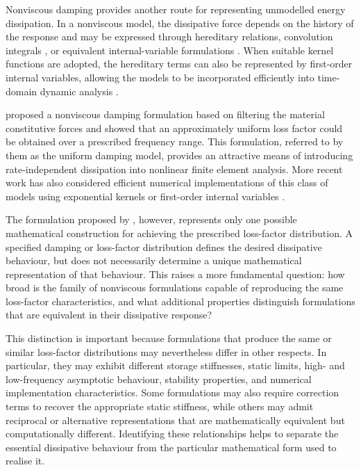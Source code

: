 Nonviscous damping provides another route for representing unmodelled energy dissipation. 
In a nonviscous model, the dissipative force depends on the history of the response and may be expressed through hereditary relations, convolution integrals \citep{WOODHOUSE:98:LinearDamping, Adhikari:Wagner:04:Convolution, ADHIKARI:07:Damping, Shen:et:al:21:TimeIntegrationMethod, Shen:et:al:22:DampingIdentification, Shen:et:al:23:CompositeImplicit, Shen:et:al:23:DampingCharacteristics, Shen:et:al:23:Eigensystem}, or equivalent internal-variable formulations \citep{Chang2024}.
When suitable kernel functions are adopted, the hereditary terms can also be represented by first-order internal variables, allowing the models to be incorporated efficiently into time-domain dynamic analysis \citep{Chang2024}.

\citet{Huang2019} proposed a nonviscous damping formulation based on filtering the material constitutive forces and showed that an approximately uniform loss factor could be obtained over a prescribed frequency range.
This formulation, referred to by them as the uniform damping model, provides an attractive means of introducing rate-independent dissipation into nonlinear finite element analysis.
More recent work has also considered efficient numerical implementations of this class of models using exponential kernels or first-order internal variables \citep{Chang2024}.

The formulation proposed by \citet{Huang2019}, however, represents only one possible mathematical construction for achieving the prescribed loss-factor distribution.
A specified damping or loss-factor distribution defines the desired dissipative behaviour, but does not necessarily determine a unique mathematical representation of that behaviour. 
This raises a more fundamental question: how broad is the family of nonviscous formulations capable of reproducing the same loss-factor characteristics, and what additional properties distinguish formulations that are equivalent in their dissipative response?

This distinction is important because formulations that produce the same or similar loss-factor distributions may nevertheless differ in other respects.
In particular, they may exhibit different storage stiffnesses, static limits, high- and low-frequency asymptotic behaviour, stability properties, and numerical implementation characteristics. 
Some formulations may also require correction terms to recover the appropriate static stiffness, while others may admit reciprocal or alternative representations that are mathematically equivalent but computationally different. 
Identifying these relationships helps to separate the essential dissipative behaviour from the particular mathematical form used to realise it.

